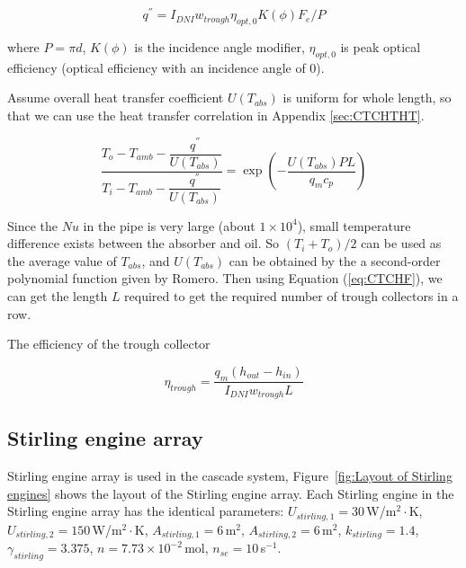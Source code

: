 \documentclass{article}
\begin{document}
\begin{equation*}
	q^{''}=I_{DNI}w_{trough}\eta_{opt,0}K(\phi)F_{e}/P
\end{equation*}

where $P=\pi{}d$, $K(\phi)$ is the incidence angle modifier, $\eta_{opt,0}$
is peak optical efficiency (optical efficiency with an incidence angle of 0).

Assume overall heat transfer coefficient $U(T_{abs})$ is uniform for whole length, so that we can use the heat transfer correlation in Appendix \ref{sec:CTCHTHT}.

\begin{equation}
	\frac{T_{o}-T_{amb}-\dfrac{q^{''}}{U(T_{abs})}}{T_{i}-T_{amb}-\dfrac{q^{''}}{U(T_{abs})}}=\exp(-\frac{U(T_{abs})PL}{q_{m}c_{p}})\label{eq:CTCHF}
\end{equation}

Since the $Nu$ in the pipe is very large (about $1\times10^4$), small temperature difference exists between the absorber and oil. So $(T_{i}+T_{o})/2$ can be used as the average value of $T_{abs}$, and $U(T_{abs})$ can be obtained by the a second-order polynomial function given by Romero\cite{Romero2007}. Then using Equation (\ref{eq:CTCHF}), we can get the length $L$ required to get the required number of trough collectors in a row.

The efficiency of the trough collector

\begin{equation*}
	\eta_{trough}=\frac{q_m(h_{out}-h_{in})}{I_{DNI}w_{trough}L}
\end{equation*}

\subsection{Stirling engine array}

Stirling engine array is used in the cascade system, Figure~\ref{fig:Layout of Stirling engines} shows the layout of the Stirling engine array. Each Stirling engine in the Stirling engine array has the identical parameters: $U_{stirling,1}=30\,$W/m$^2\cdot$K, $U_{stirling,2}=150\,$W/m$^2\cdot$K, $A_{stirling,1}=6\,$m$^2$, $A_{stirling,2}=6\,$m$^2$, $k_{stirling}=1.4$, $\gamma_{stirling}=3.375$, $n=7.73\times{}10^{-2}\,$mol, $n_{se}=10\,$s$^{-1}$.
\end{document}
